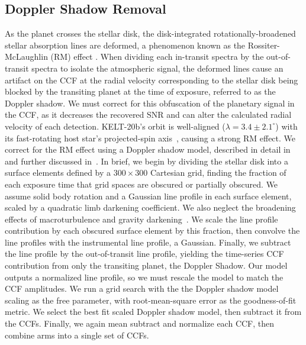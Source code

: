 \documentclass[twocolumn]{aastex631}
\begin{document}
       \subsection{Doppler Shadow Removal}\label{subsec:DopplerShadowRemoval}
                As the planet crosses the stellar disk, the disk-integrated rotationally-broadened stellar absorption lines are deformed, a phenomenon known as the Rossiter-McLaughlin (RM) effect \citep{Rossiter1924, McLaughlin1924}. When dividing each in-transit spectra by the out-of-transit spectra to isolate the atmospheric signal, the deformed lines cause an artifact on the CCF at the radial velocity corresponding to the stellar disk being blocked by the transiting planet at the time of exposure, referred to as the Doppler shadow. We must correct for this obfuscation of the planetary signal in the CCF, as it decreases the recovered SNR and can alter the calculated radial velocity of each detection. KELT-20b's orbit is well-aligned ($\lambda = 3.4 \pm 2.1 ^{\circ}$) with its fast-rotating host star's projected-spin axis~\citep{Lund2017}, causing a strong RM effect. We correct for the RM effect using a Doppler shadow model, described in detail in~\citet{Johnson2016} and further discussed in~\citet{Johnson2014, Johnson2017}. In brief, we begin by dividing the stellar disk into a surface elements defined by a $300 \times 300$ Cartesian grid, finding the fraction of each exposure time that grid spaces are obscured or partially obscured. We assume solid body rotation and a Gaussian line profile in each surface element, scaled by a quadratic limb darkening coefficient. We also neglect the broadening effects of macroturbulence and gravity darkening~\citet{Johnson2016}. We scale the line profile contribution by each obscured surface element by this fraction, then convolve the line profiles with the instrumental line profile, a Gaussian. Finally, we subtract the line profile by the out-of-transit line profile, yielding the time-series CCF contribution from only the transiting planet, the Doppler Shadow. Our model outputs a normalized line profile, so we must rescale the model to match the CCF amplitudes. We run a grid search with the the Doppler shadow model scaling as the free parameter, with root-mean-square error as the goodness-of-fit metric. We select the best fit scaled Doppler shadow model, then subtract it from the CCFs. Finally, we again mean subtract and normalize each CCF, then combine arms into a single set of CCFs.
                
\end{document}
